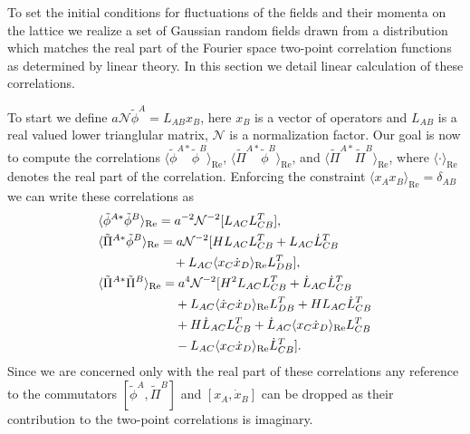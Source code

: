 To set the initial conditions for fluctuations of the fields and their momenta on the lattice we realize a set of Gaussian random fields drawn from a distribution which matches the real part of the Fourier space two-point correlation functions as determined by linear theory. In this section we detail linear calculation of these correlations.

To start we define $a\mathcal{N}\tilde{\phi}^A = L_{AB}x_B$, here $x_{B}$ is a vector of operators and $L_{AB}$ is a real valued lower trianglular matrix, $\mathcal{N}$ is a normalization factor. Our goal is now to compute the correlations $\langle\tilde{\phi}^{A*}\tilde{\phi}^B\rangle_\mathrm{Re}$, $\langle\tilde{\Pi}^{A*}\tilde{\phi}^B\rangle_\mathrm{Re}$, and $\langle\tilde{\Pi}^{A*}\tilde{\Pi}^B\rangle_\mathrm{Re}$, where $\langle\cdot\rangle_\mathrm{Re}$ denotes the real part of the correlation. Enforcing the constraint $\langle x_Ax_B \rangle_\mathrm{Re} = \delta_{AB}$ we can write these correlations as
\begin{align}
  & \langle\tilde{\phi}^{A*}\tilde{\phi}^B\rangle_\mathrm{Re} =  a^{-2}\mathcal{N}^{-2}[L_{AC}L_{CB}^T], \\
  & \langle\tilde{\Pi}^{A*}\tilde{\phi}^B\rangle_\mathrm{Re} = a\mathcal{N}^{-2}[HL_{AC}L_{CB}^T + L_{AC}\dot{L}_{CB}^T \nonumber \\
  & \hphantom{\langle\tilde{\Pi}^{A*}\tilde{\phi}^B\rangle_\mathrm{Re} =} + L_{AC}\langle x_C\dot{x}_D\rangle_\mathrm{Re}L_{DB}^T], \\
  & \langle\tilde{\Pi}^{A*}\tilde{\Pi}^B\rangle_\mathrm{Re} =  a^4\mathcal{N}^{-2}[H^2L_{AC}L_{CB}^T + \dot{L}_{AC}\dot{L}_{CB}^T \nonumber \\
  & \hphantom{\langle\tilde{\Pi}^{A*}\tilde{\Pi}^B\rangle_\mathrm{Re} =} + L_{AC}\langle \dot{x}_C\dot{x}_D\rangle_\mathrm{Re}L_{DB}^T + HL_{AC}\dot{L}_{CB}^T \nonumber \\
  & \hphantom{\langle\tilde{\Pi}^{A*}\tilde{\Pi}^B\rangle_\mathrm{Re} =} + H\dot{L}_{AC}L_{CB}^T + \dot{L}_{AC}\langle x_C\dot{x}_D\rangle_\mathrm{Re}L_{CB}^T \nonumber \\
  & \hphantom{\langle\tilde{\Pi}^{A*}\tilde{\Pi}^B\rangle_\mathrm{Re} =} - L_{AC}\langle x_C\dot{x}_D\rangle_\mathrm{Re}\dot{L}_{CB}^T].
\end{align}
Since we are concerned only with the real part of these correlations any reference to the commutators $[\tilde{\phi}^A, \tilde{\Pi}^B]$ and $[x_A,\dot{x}_B]$ can be dropped as their contribution to the two-point correlations is imaginary.

